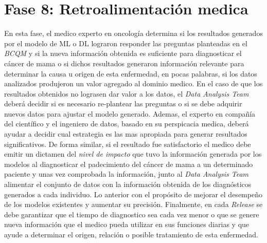 \section{Fase 8: Retroalimentación medica }
En esta fase, el medico experto en oncología determina si los resultados generados por el modelo de ML o DL lograron responder las preguntas planteadas en el \textit{BCQM} y si la nueva información obtenida es suficiente para diagnosticar el cáncer de mama o si dichos resultados generaron información relevante para determinar la causa u origen de esta enfermedad, en pocas palabras, si los datos analizados produjeron un valor agregado al dominio medico. En el caso de que los resultados obtenidos no lograsen dar valor a los datos, el \textit{Data Analysis Team} deberá decidir si es necesario re-plantear las preguntas o si se debe adquirir nuevos datos para ajustar el modelo generado. Ademas, el experto en compañía del científico y el ingeniero de datos, basado en su perspicacia medica, deberá ayudar a decidir cual estrategia es las mas apropiada para generar resultados significativos. De forma similar, si el resultado fue satisfactorio el medico debe emitir un dictamen del \textit{nivel de impacto} que tuvo la información generada por los modelos al diagnosticar el padecimiento del cáncer de mama a un determinado paciente y unas vez comprobada la información, junto al \textit{Data Analysis Team} alimentar el conjunto de datos con la información obtenida de los diagnósticos generados a cada individuo. Lo anterior con el propósito de mejorar el desempeño de los modelos existentes y aumentar su precisión. Finalmente, en cada \textit{Release} se debe garantizar que el tiempo de diagnostico sea cada vez menor o que se genere nueva información que el medico pueda utilizar en sus funciones diarias y que ayude a determinar el origen, relación o posible tratamiento de esta enfermedad.

